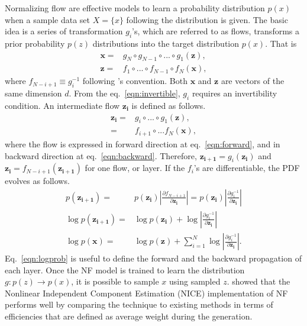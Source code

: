     
    Normalizing flow are effective models to learn a probability distribution $p(x)$ when a sample data set $X=\{x\}$ following the distribution is given. The basic idea is a series of transformation $g_i$'s, which are referred to as flows, transforms a prior probability $p(z)$ distributions into the target distribution $p(x)$. That is
    \begin{align}
        \mathbf{x} =& g_N \circ g_{N-1}\circ ... \circ g_1 (\mathbf{z}), \\
        \mathbf{z} =& f_1 \circ ... \circ f_{N-1} \circ f_N (\mathbf{x}), \label{eqn:invertible}
    \end{align}
    where $f_{N-i+1}\equiv g_i^{-1}$ following \parencite{Kobyzev2021NormalizingMethods}'s convention. Both $\mathbf{x}$ and $\mathbf{z}$ are vectors of the same dimension $d$. From the eq.~\ref{eqn:invertible}, $g_i$ requires an invertibility condition. An intermediate flow $\mathbf{z_i}$ is defined as follows.
    \begin{align}
    \mathbf{z_i} =&g_i \circ ... \circ g_1(\mathbf{z}), \label{eqn:forward}\\
        =&f_{i+1}\circ ...f_N(\mathbf{x}), \label{eqn:backward}
    \end{align}
    where the flow is expressed in forward direction at eq.~\ref{eqn:forward}, and in backward direction at eq.~\ref{eqn:backward}. Therefore, $\mathbf{z_{i+1}}=g_i (\mathbf{z_i})$ and $\mathbf{z_i} = f_{N-i+1}(\mathbf{z_{i+1}})$ for one flow, or layer. If the $f_i$'s are differentiable, the PDF evolves as follows.
    \begin{align}
     p(\mathbf{z_{i+1}})=& p(\mathbf{z_i})|\frac{\partial f_{N-i+1}}{\partial \mathbf{z_i}}| =p(\mathbf{z_i})|\frac{\partial g_{i}^{-1}}{\partial \mathbf{z_i}}|\\
     \log p(\mathbf{z_{i+1}}) =& \log p(\mathbf{z_i}) + \log|\frac{\partial g_i^{-1}}{\partial \mathbf{z_i}}| \label{eqn:logprob}\\
     \log p(\mathbf{x}) =& \log p(\mathbf{z}) + \sum\limits_{i=1}^N \log|\frac{\partial g_i^{-1}}{\partial \mathbf{z_i}}|.
    \end{align}
    Eq.~\ref{eqn:logprob} is useful to define the forward and the backward propagation of each layer.
    Once the NF model is trained to learn the distribution $g: p(z)\rightarrow p(x)$, it is possible to sample $x$ using sampled $z$. \parencite{Gao2020EventFlows} showed that the Nonlinear Independent Component Estimation (NICE) \parencite{Dinh2014NICE:Estimation} implementation of NF performs well by comparing the technique to existing methods in terms of efficiencies that are defined as average weight during the generation.

